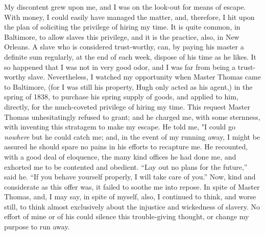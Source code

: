 My discontent grew upon me, and I was on the look-out for means of
escape. With money, I could easily have managed the matter, and,
therefore, I hit upon the plan of soliciting the privilege of hiring my
time. It is quite common, in Baltimore, to allow slaves this privilege,
and it is the practice, also, in New Orleans. A slave who is considered
{\protect\hypertarget{327}{}{}}trust-worthy, can, by paying his master a
definite sum regularly, at the end of each week, dispose of his time as
he likes. It so happened that I was not in very good odor, and I was far
from being a trust-worthy slave. Nevertheless, I watched my opportunity
when Master Thomas came to Baltimore, (for I was still his property,
Hugh only acted as his agent,) in the spring of 1838, to purchase his
spring supply of goods, and applied to him, directly, for the
much-coveted privilege of hiring my time. This request Master Thomas
unhesitatingly refused to grant; and he charged me, with some sternness,
with inventing this stratagem to make my escape. He told me, "I could go
\emph{nowhere} but he could catch me; and, in the event of my running
away, I might be assured he should spare no pains in his efforts to
recapture me. He recounted, with a good deal of eloquence, the many kind
offices he had done me, and exhorted me to be contented and obedient.
``Lay out no plans for the future,'' said he. ``If you behave yourself
properly, I will take care of you.'' Now, kind and considerate as this
offer was, it failed to soothe me into repose. In spite of Master
Thomas, and, I may say, in spite of myself, also, I continued to think,
and worse still, to think almost exclusively about the injustice and
wickedness of slavery. No effort of mine or of his could silence this
trouble-giving thought, or change my purpose to run away.

